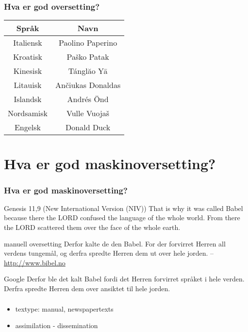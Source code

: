 \documentclass{beamer}
\begin{document}
\begin{frame}
\frametitle{Hva er god oversetting?}
\begin{tabular}{|c|c|}
\hline
\textbf{Språk} & \textbf{Navn} \\
\hline
Italiensk &  Paolino Paperino  \\
\hline
Kroatisk &  Paško Patak  \\
\hline
Kinesisk & Tánglăo Yā \\
\hline
Litauisk & Ančiukas Donaldas \\
\hline
Islandsk & Andrés Önd \\
\hline
Nordsamisk & Vulle Vuojaš \\
\hline
Engelsk & Donald Duck \\
\hline
\end{tabular}
\end{frame}

\section{Hva er god maskinoversetting?}
%
\begin{frame}\frametitle{Hva er god maskinoversetting?}
%
\begin{exampleblock}{Genesis 11,9 (New International Version (NIV))}
That is why it was called Babel because there the LORD confused the language of the whole world. From 
there the LORD scattered them over the face of the whole earth.
\end{exampleblock}

\begin{exampleblock}{manuell oversetting}
Derfor kalte de den Babel. For der forvirret Herren all verdens tungemål, og derfra spredte Herren dem ut over hele jorden.
-- \url{http://www.bibel.no}
\end{exampleblock}

\begin{exampleblock}{Google}
Derfor ble det kalt Babel fordi det Herren forvirret språket i hele verden. Derfra spredte Herren dem over ansiktet til hele jorden.
\end{exampleblock}
\end{frame}
 
\begin{frame}
\frametitle{}
\begin{itemize}
\item textype: manual, newspapertexts
\item assimilation - dissemination
\end{itemize} 
\end{frame}
\end{document}
